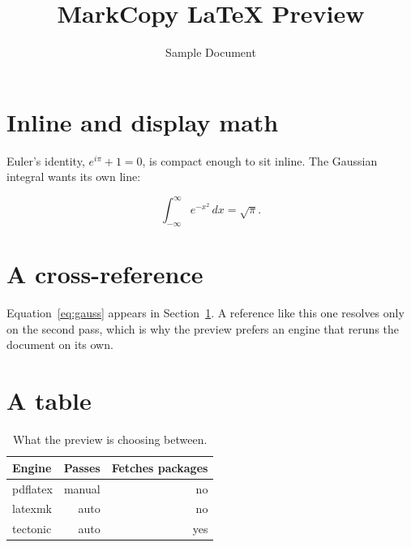 \documentclass[11pt]{article}
\title{MarkCopy LaTeX Preview}
\author{Sample Document}
\date{}
\begin{document}
\maketitle

\section{Inline and display math}
\label{sec:math}

Euler's identity, $e^{i\pi} + 1 = 0$, is compact enough to sit inline. The
Gaussian integral wants its own line:

\begin{equation}
  \label{eq:gauss}
  \int_{-\infty}^{\infty} e^{-x^2} \, dx = \sqrt{\pi}.
\end{equation}

\section{A cross-reference}

Equation~\eqref{eq:gauss} appears in Section~\ref{sec:math}. A reference like
this one resolves only on the second pass, which is why the preview prefers an
engine that reruns the document on its own.

\section{A table}

\begin{table}[h]
  \centering
  \begin{tabular}{lrr}
    \toprule
    Engine    & Passes & Fetches packages \\
    \midrule
    pdflatex  & manual & no  \\
    latexmk   & auto   & no  \\
    tectonic  & auto   & yes \\
    \bottomrule
  \end{tabular}
  \caption{What the preview is choosing between.}
\end{table}
\end{document}
